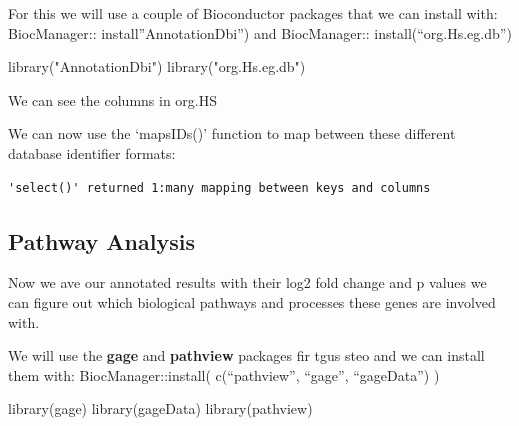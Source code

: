 \documentclass[
  letterpaper,
  DIV=11,
  numbers=noendperiod]{scrartcl}
\newenvironment{Shaded}{\begin{snugshade}}{\end{snugshade}}
\newcommand{\AttributeTok}[1]{\textcolor[rgb]{0.40,0.45,0.13}{#1}}
\newcommand{\FunctionTok}[1]{\textcolor[rgb]{0.28,0.35,0.67}{#1}}
\newcommand{\NormalTok}[1]{\textcolor[rgb]{0.00,0.23,0.31}{#1}}
\newcommand{\OtherTok}[1]{\textcolor[rgb]{0.00,0.23,0.31}{#1}}
\newcommand{\SpecialCharTok}[1]{\textcolor[rgb]{0.37,0.37,0.37}{#1}}
\newcommand{\StringTok}[1]{\textcolor[rgb]{0.13,0.47,0.30}{#1}}
\begin{document}
For this we will use a couple of Bioconductor packages that we can
install with: BiocManager:: install''AnnotationDbi'') and BiocManager::
install(``org.Hs.eg.db'')

\begin{Shaded}
\begin{Highlighting}[]
\FunctionTok{library}\NormalTok{(}\StringTok{"AnnotationDbi"}\NormalTok{)}
\FunctionTok{library}\NormalTok{(}\StringTok{"org.Hs.eg.db"}\NormalTok{)}
\end{Highlighting}
\end{Shaded}

We can see the columns in org.HS

We can now use the `mapsIDs()' function to map between these different
database identifier formats:

\begin{Shaded}
\end{Shaded}

\begin{verbatim}
'select()' returned 1:many mapping between keys and columns
\end{verbatim}

\subsection{Pathway Analysis}\label{pathway-analysis}

Now we ave our annotated results with their log2 fold change and p
values we can figure out which biological pathways and processes these
genes are involved with.

We will use the \textbf{gage} and \textbf{pathview} packages fir tgus
steo and we can install them with: BiocManager::install( c(``pathview'',
``gage'', ``gageData'') )

\begin{Shaded}
\begin{Highlighting}[]
\FunctionTok{library}\NormalTok{(gage)}
\FunctionTok{library}\NormalTok{(gageData)}
\FunctionTok{library}\NormalTok{(pathview)}
\end{Highlighting}
\end{Shaded}
\end{document}
